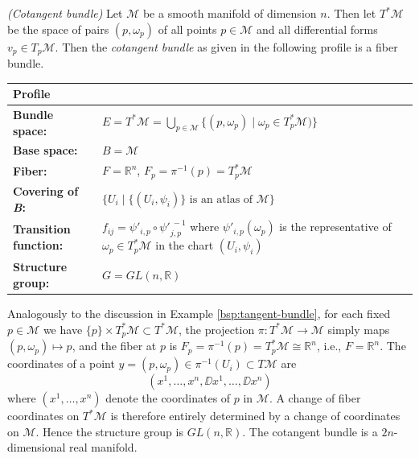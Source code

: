 \begin{beispiel}
	\label{bsp:cotangent-bundle}
	\emph{(Cotangent bundle)}
	\cite[138]{Choquet-Bruhat-et-al-1982}
	Let $\mathscr{M}$ be a smooth manifold of dimension $n$. Then let $T^* \mathscr{M}$ be the space of pairs $(p, \omega_p)$ of all points $p \in \mathscr{M}$ and all differential forms $v_p \in T_p \mathscr{M}$.
	Then the \emph{cotangent bundle}
	as given in the following profile is a fiber bundle.
	
	\medskip
	\noindent
	\begin{tabular}[b]{@{}|lp{50ex}|}
		\hline
		\multicolumn{2}{|l|}{\textbf{Profile}} \\ \hline
		\textbf{Bundle space:} & $E = T^* \mathscr{M} = \bigcup_{p \in \mathscr{M}} \{(p, \omega_p) \mid \omega_p \in T^*_p \mathscr{M})\}$
		\\
		\textbf{Base space:} & $B = \mathscr{M}$
		\\
		\textbf{Fiber:} & $F = \mathbb{R}^n$, $F_p = \pi^{-1}(p) = T^*_p \mathscr{M}$
		\\
		\textbf{Covering of \emph{B}:} &
		$\{U_i \mid \{(U_i, \psi_i)\} \mbox{ is an atlas of } \mathscr{M}\}$
		\\
		\textbf{Transition function:} &
		$f_{ij} = \psi'_{i,p} \circ {\psi'}_{j,p}^{\ -1}$ where $\psi'_{i,p}(\omega_p)$ is the representative of $\omega_p \in T^*_p \mathscr{M}$ in the chart $(U_i, \psi_i)$
		\\
		\textbf{Structure group:} &
		$G = GL(n, \mathbb{R})$
		\\ \hline
	\end{tabular}
	
	\medskip
	\noindent
	Analogously to the discussion in Example \ref{bsp:tangent-bundle},
	for each fixed $p \in \mathscr{M}$ we have $\{p\} \times T^*_p \mathscr{M} \subset T^*\mathscr{M}$,
	the projection $\pi: T^* \mathscr{M} \to \mathscr{M}$ simply maps $(p, \omega_p) \mapsto p$, and the fiber at $p$ is $F_p = \pi^{-1}(p) = T^*_p \mathscr{M} \cong \mathbb{R}^n$, i.e., $F = \mathbb{R}^n$.
	The coordinates of a point $y = (p, \omega_p) \in \pi^{-1}(U_i) \subset T\mathscr{M}$ are
	\begin{equation}
		(x^1, \ldots, x^n, \DD x^1, \ldots, \DD x^n)
	\end{equation}
	where $(x^1, \ldots, x^n)$ denote the coordinates of $p$ in $\mathscr{M}$.
	A change of fiber coordinates on $T^* \mathscr{M}$ is therefore entirely determined by a change of coordinates on $\mathscr{M}$.
	Hence the structure group is $GL(n, \mathbb{R})$. %
	The cotangent bundle is a $2n$-dimensional real manifold. \cite[585]{Teubner-Taschenbuch-2}
\end{beispiel}


